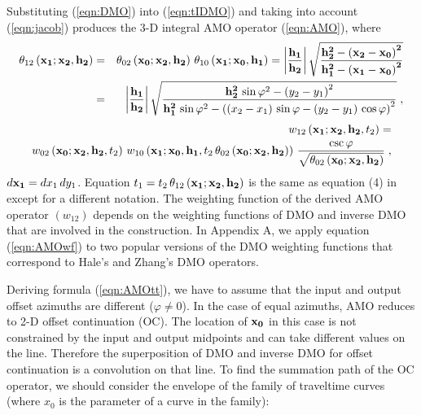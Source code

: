 \par
Substituting (\ref{eqn:DMO}) into (\ref{eqn:tIDMO}) and taking into account
(\ref{eqn:jacob}) produces the 3-D integral AMO operator (\ref{eqn:AMO}),
where
\begin{eqnarray}
\theta_{12}\left({\bf x_1;x_2, h_2}\right) & = &
\theta_{02}\left({\bf x_0;x_2, h_2}\right)\,
\theta_{10}\left({\bf x_1;x_0, h_1}\right)=
{\left|{\bf h_1 \over h_2}\right|}\,
\sqrt{{\bf {h_2^2-\left(x_2-x_0\right)^2} \over
{h_1^2-\left(x_1-x_0\right)^2}}}
\nonumber \\
& = &
{\left|{\bf h_1 \over h_2}\right|}\,
\sqrt{{{\bf h_2^2}\,\sin{\varphi}^2-\left(y_2-y_1\right)^2} \over
{{\bf h_1^2}\,\sin{\varphi}^2-
\left(\left(x_2-x_1\right)\,\sin{\varphi}-
\left(y_2-y_1\right)\,\cos{\varphi}\right)^2}}\;,
\label{eqn:AMOtt}
\end{eqnarray}
\begin{eqnarray}
\nonumber
w_{12}\left({\bf x_1;x_2, h_2},t_2\right) = \\
w_{02}\left({\bf x_0;x_2, h_2},t_2\right)\,
w_{10}\left({\bf x_1;x_0, h_1},t_2\,
\theta_{02}\left({\bf x_0;x_2, h_2}\right)\right)\,
{\csc{\varphi}\over \sqrt{\theta_{02}\left({\bf x_0;x_2, h_2}\right)}}\;,
\label{eqn:AMOwf}
\end{eqnarray}
$d{\bf x_1}=dx_1\,dy_1$. Equation 
$t_1=t_2\,\theta_{12}\left({\bf x_1;x_2, h_2}\right)$ is the same
as equation (4) in \cite[]{Biondi.sep.80.125} except for a different
notation. The weighting function of the derived AMO operator
$\left(w_{12}\right)$ 
depends on the weighting functions of DMO and inverse DMO that are involved in
the construction. In Appendix A, we apply equation (\ref{eqn:AMOwf}) to two
popular versions of the DMO weighting functions that
correspond to Hale's \cite[]{Hale} and Zhang's
\cite[]{Zhang.sep.59.201} DMO operators.
\par
Deriving formula (\ref{eqn:AMOtt}), we have to assume
that the input 
and output offset azimuths are different ($\varphi \neq 0$). In the case
of equal azimuths, AMO reduces to 2-D offset continuation (OC). The
location of ${\bf x_0}$ in this case is not constrained by the input
and output midpoints and can take different values on the line.
Therefore the superposition of DMO and inverse DMO for offset
continuation is a convolution on that line. To find the summation path
of the OC operator, we should consider the envelope of the family of traveltime
curves (where $x_0$ is the parameter of a curve in the family):
